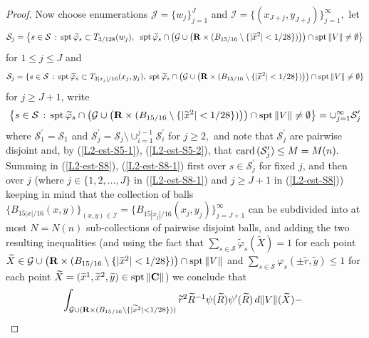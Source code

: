 \documentclass[a4paper,11pt]{amsart}
\begin{document}
\begin{proof}
Now choose enumerations ${\mathcal J} = \{w_{j}\}_{j=1}^{J}$ and 
${\mathcal I} = \{(x_{J+j}, y_{J+j})\}_{j=1}^{\infty},$ let 
$${\mathcal S}_{j} = \left\{s \in {\mathcal S} \, : \, 
{\rm spt} \, \widetilde{\varphi}_{s} \subset T_{3/128}(w_{j}), \;\; {\rm spt} \, \widetilde{\varphi}_{s} \cap \left({\mathcal G} \cup \left({\mathbf R} \times (B_{15/16} \setminus \{|\widetilde{x}^{2}| < 1/28\})\right)\right) \cap {\rm spt} \, \|V\| \neq \emptyset\right\}$$ 
for $1 \leq j \leq J$ and 
$${\mathcal S}_{j} = \{s \in {\mathcal S} \, : \, 
{\rm spt} \, \widetilde{\varphi}_{s} \subset T_{3|x_{j}|/16}(x_{j},y_{j}), \;{\rm spt} \, \widetilde{\varphi}_{s} \cap \left({\mathcal G} \cup \left({\mathbf R} \times (B_{15/16} \setminus \{|\widetilde{x}^{2}| < 1/28\})\right)\right) \cap {\rm spt} \, \|V\| \neq \emptyset\}$$ 
for $j \geq J+1$, write 
$$\left\{s \in {\mathcal S} \, : \, {\rm spt} \, \widetilde{\varphi}_{s} \cap \left({\mathcal G} \cup \left({\mathbf R} \times (B_{15/16} \setminus \{|\widetilde{x}^{2}| < 1/28\})\right)\right) \cap {\rm spt} \, \|V\| \neq \emptyset\right\} = \cup_{j=1}^{\infty} {\mathcal S}^{\prime}_{j}$$
where ${\mathcal S}^{\prime}_{1} = {\mathcal S}_{1}$ and ${\mathcal S}^{\prime}_{j} = {\mathcal S}_{j} \setminus \cup_{i=1}^{j-1} {\mathcal S}_{i}^{\prime}$ for $j \geq 2,$ and note that ${\mathcal S}^{\prime}_{j}$ are pairwise disjoint and, by 
(\ref{L2-est-S5-1}), (\ref{L2-est-S5-2}), that ${\rm card} \, ({\mathcal S}^{\prime}_{j}) \leq M = M(n).$
Summing in (\ref{L2-est-S8}), (\ref{L2-est-S8-1}) first over $s \in {\mathcal S}_{j}^{\prime}$ for fixed $j$, and then over $j$ (where $j\in \{1, 2, \ldots, J\}$ in (\ref{L2-est-S8-1}) and $j \geq J+1$ in (\ref{L2-est-S8})) keeping in mind that the collection of balls $\{B_{15|x|/16}(x,y)\}_{(x,y) \in {\mathcal I}} = 
\{B_{15|x_{j}|/16}(x_{j}, y_{j})\}_{j=J+1}^{\infty}$ can be subdivided into at most $N = N(n)$ sub-collections of pairwise disjoint balls,  and adding the two resulting inequalities (and using the fact that $\sum_{s \in {\mathcal S}} \widetilde{\varphi}_{s}(\widetilde{X}) = 1$ for each point $\widetilde{X} \in {\mathcal G} \cup \left({\mathbf R} \times (B_{15/16} \setminus \{|\widetilde{x}^{2}| < 1/28\})\right) \cap {\rm spt} \, \|V\|$ and 
$\sum_{s \in {\mathcal S}} \varphi_{s}(\pm\widetilde{r}, \widetilde{y}) \leq 1$ for each point 
$\widetilde{X} = (\widetilde{x}^{1}, \widetilde{x}^{2}, \widetilde{y}) \in {\rm spt } \, \|{\mathbf C}\|$) we conclude that 
\begin{eqnarray}\label{L2-est-S9}
&&\hspace{-.2in}\int_{{\mathcal G} \cup ({\mathbf R} \times (B_{15/16} \setminus \{|\widetilde{x}^{2}| < 1/28\}))}\widetilde{r}^{2}\widetilde{R}^{-1}\psi(\widetilde{R})\psi^{\prime}(\widetilde{R}) \, d\|V\|(\widetilde{X}) - 

\end{eqnarray}
\end{proof}
\end{document}
